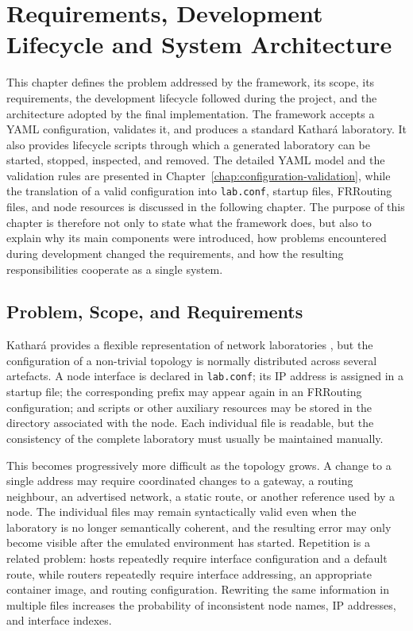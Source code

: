 \chapter{Requirements, Development Lifecycle and System Architecture}
\label{chap:requirements-architecture}

This chapter defines the problem addressed by the framework, its scope, its
requirements, the development lifecycle followed during the project, and the
architecture adopted by the final implementation. The framework accepts a YAML
configuration, validates it, and produces a standard Kathar\'a laboratory. It
also provides lifecycle scripts through which a generated laboratory can be
started, stopped, inspected, and removed. The detailed YAML model and the
validation rules are presented in Chapter~\ref{chap:configuration-validation},
while the translation of a valid configuration into \texttt{lab.conf}, startup
files, FRRouting files, and node resources is discussed in the following
chapter. The purpose of this chapter is therefore not only to state what the
framework does, but also to explain why its main components were introduced,
how problems encountered during development changed the requirements, and how
the resulting responsibilities cooperate as a single system.

\section{Problem, Scope, and Requirements}
\label{sec:problem-scope-requirements}

Kathar\'a provides a flexible representation of network laboratories
\cite{kathara_website,kathara_manpage}, but the configuration of a non-trivial
topology is normally distributed across several artefacts. A node interface is declared in \texttt{lab.conf}; its IP address is
assigned in a startup file; the corresponding prefix may appear again in an
FRRouting configuration; and scripts or other auxiliary resources may be
stored in the directory associated with the node. Each individual file is
readable, but the consistency of the complete laboratory must usually be
maintained manually.

This becomes progressively more difficult as the topology grows. A change to a
single address may require coordinated changes to a gateway, a routing
neighbour, an advertised network, a static route, or another reference used by
a node. The individual files may remain syntactically valid even when the
laboratory is no longer semantically coherent, and the resulting error may
only become visible after the emulated environment has started. Repetition is
a related problem: hosts repeatedly require interface configuration and a
default route, while routers repeatedly require interface addressing, an
appropriate container image, and routing configuration. Rewriting the same
information in multiple files increases the probability of inconsistent node
names, IP addresses, and interface indexes.

